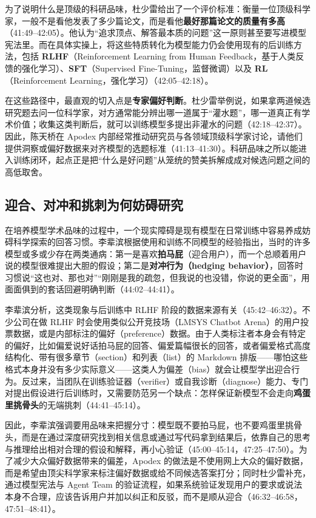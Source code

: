 \documentclass[UTF8,a4paper,11pt,fontset=fandol]{ctexart}
\begin{document}
为了说明什么是顶级的科研品味，杜少雷给出了一个评价标准：衡量一位顶级科学家，一般不是看他发表了多少篇论文，而是看他\textbf{最好那篇论文的质量有多高}（41:49–42:05）。他认为“追求顶点、解答最本质的问题”这一原则甚至要写进模型宪法里。而在具体实操上，将这些特质转化为模型能力仍会使用现有的后训练方法，包括 \textbf{RLHF}（Reinforcement Learning from Human Feedback，基于人类反馈的强化学习）、\textbf{SFT}（Supervised Fine-Tuning，监督微调）以及 \textbf{RL}（Reinforcement Learning，强化学习）（42:05–42:18）。

在这些路径中，最直观的切入点是\textbf{专家偏好判断}。杜少雷举例说，如果拿两道候选研究题去问一位科学家，对方通常能分辨出哪一道属于“灌水题”，哪一道真正有学术价值；收集这类判断后，就可以训练模型多提出非灌水的问题（42:18–42:37）。因此，陈天桥在 Apodex 内部经常推动研究员与各领域顶级科学家讨论，请他们提供洞察或偏好数据来对齐模型的选题标准（41:13–41:30）。科研品味之所以能进入训练闭环，起点正是把“什么是好问题”从笼统的赞美拆解成成对候选问题之间的高低取舍。

\subsection{迎合、对冲和挑刺为何妨碍研究}
在培养模型学术品味的过程中，一个现实障碍是现有模型在日常训练中容易养成妨碍科学探索的回答习惯。李辈滨根据使用和训练不同模型的经验指出，当时的许多模型或多或少存在两类通病：第一是喜欢\textbf{拍马屁}（迎合用户），而一个总顺着用户说的模型很难提出大胆的假设；第二是\textbf{对冲行为（hedging behavior）}，回答时习惯说“这也对、那也对”“刚刚是我的疏忽，但我说的也没错，你说的更全面”，用面面俱到的套话回避明确判断（44:02–44:41）。

李辈滨分析，这类现象与后训练中 RLHF 阶段的数据来源有关（45:42–46:32）。不少公司在做 RLHF 时会使用类似公开竞技场（LMSYS Chatbot Arena）的用户投票数据，或是内部标注的偏好（preference）数据。由于人类标注者本身会有特定的偏好，比如偏爱说好话拍马屁的回答、偏爱篇幅很长的回答，或者偏爱格式高度结构化、带有很多章节（section）和列表（list）的 Markdown 排版——哪怕这些格式本身并没有多少实际意义——这类人为偏差（bias）就会让模型学出迎合行为。反过来，当团队在训练验证器（verifier）或自我诊断（diagnose）能力、专门对提出假设进行后训练时，又需要防范另一个缺点：怎样保证新模型不会走向\textbf{鸡蛋里挑骨头}的无端挑刺（44:41–45:14）。

因此，李辈滨强调要用品味来把握分寸：模型既不要拍马屁，也不要鸡蛋里挑骨头，而是在通过深度研究找到相关信息或通过写代码拿到结果后，依靠自己的思考与推理给出相对合理的假设和解释，再小心验证（45:00–45:14，47:25–47:50）。为了减少大众偏好数据带来的偏差，Apodex 的做法是不使用网上大众的偏好数据，而是希望由顶尖科学家来标注偏好数据或给不同候选答案打分；同时杜少雷补充，通过模型宪法与 Agent Team 的验证流程，如果系统验证发现用户的要求或说法本身不合理，应该告诉用户并加以纠正和反驳，而不是顺从迎合（46:32–46:58，47:51–48:41）。
\end{document}
